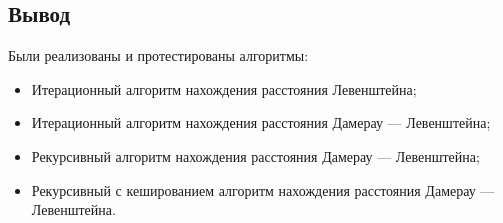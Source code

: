 \subsection*{Вывод}

Были реализованы и протестированы алгоритмы:
\begin{itemize}
    \item Итерационный алгоритм нахождения расстояния Левенштейна;
    \item Итерационный алгоритм нахождения расстояния Дамерау --- Левенштейна;
    \item Рекурсивный алгоритм нахождения расстояния Дамерау --- Левенштейна;
    \item Рекурсивный с кешированием алгоритм нахождения расстояния Дамерау --- Левенштейна.
\end{itemize}
